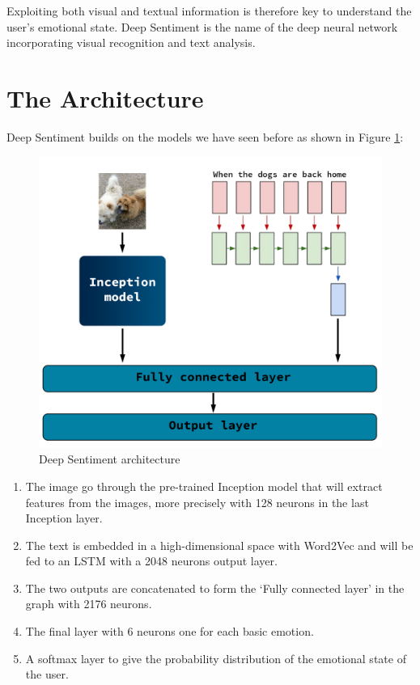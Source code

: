 Exploiting both visual and textual information is therefore key to understand the user's emotional state. Deep Sentiment is the name of the deep neural network incorporating visual recognition and text analysis.

\section{The Architecture}

Deep Sentiment builds on the models we have seen before as shown in Figure \ref{deep-sentiment}:

\begin{figure}[H]
    \centering
    \includegraphics[width=\textwidth]{Images/deep-sentiment.png}
    \caption{Deep Sentiment architecture}
    \label{deep-sentiment}
\end{figure}

\begin{enumerate}
    \item The image go through the pre-trained Inception model that will extract features from the images, more precisely with 128 neurons in the last Inception 
    layer.
    \item The text is embedded in a high-dimensional space with Word2Vec and will be fed to an LSTM with a 2048 neurons output layer.
    \item The two outputs are concatenated to form the `Fully connected layer' in the graph with 2176 neurons. 
    \item The final layer with 6 neurons one for each basic emotion.
    \item A softmax layer to give the probability distribution of the emotional state of the user.
\end{enumerate}

